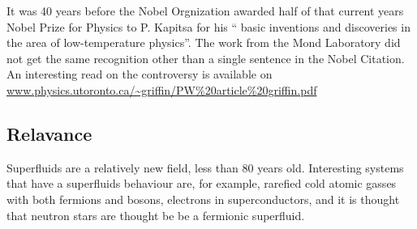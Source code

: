It was 40 years before the Nobel Orgnization\cite{kapitsanobelprize} awarded half of that current years %
Nobel Prize for Physics to P. Kapitsa for his `` basic inventions and discoveries in the area
of low-temperature physics''. The work from the Mond Laboratory did not get the
same recognition other than a single sentence in the Nobel Citation.
An interesting read on the
controversy is available on \url{www.physics.utoronto.ca/~griffin/PW\%20article\%20griffin.pdf}



 

\subsection{Relavance}
Superfluids are a relatively new field, less than 80 years old. Interesting 
systems that have a superfluids behaviour are, for example, rarefied cold atomic gasses with 
both fermions and bosons, electrons in superconductors, and it is thought that 
neutron stars are thought be be a fermionic superfluid.


